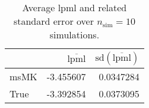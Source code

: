 \begin{table}[H]

\caption{Average lpml and related standard error over $n_{\text{sim}} = 10$ simulations.}
\centering
\begin{tabular}[t]{lrr}
\toprule
  & $\overbar{\text{lpml}}$ & $\text{sd}(\overbar{\text{lpml}})$\\
\midrule
msMK & -3.455607 & 0.0347284\\
True & -3.392854 & 0.0373095\\
\bottomrule
\end{tabular}
\end{table}